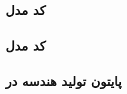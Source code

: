 \documentclass[11pt]{article} %
\begin{document}
%
%
\subsection{کد مدل }
\begin{latin}

\end{latin}
\subsection{کد مدل }
\begin{latin}

\end{latin}
\subsection{پایتون تولید هندسه در }

\begin{latin}
%
\end{latin}



\end{document}
